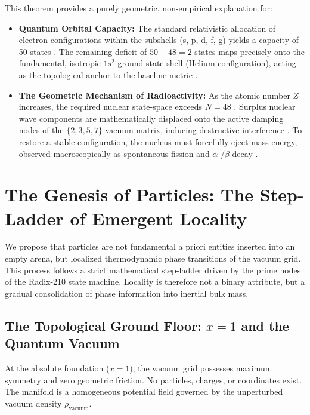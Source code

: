 \documentclass[twocolumn]{aa}
\begin{document}
This theorem provides a purely geometric, non-empirical explanation for:
\begin{itemize}
    \item \textbf{Quantum Orbital Capacity:} The standard relativistic allocation of electron configurations within the subshells (s, p, d, f, g) yields a capacity of 50 states \cite{riemann1857}. The remaining deficit of $50 - 48 = 2$ states maps precisely onto the fundamental, isotropic $1s^2$ ground-state shell (Helium configuration), acting as the topological anchor to the baseline metric \cite{riemann1857}.
    \item \textbf{The Geometric Mechanism of Radioactivity:} As the atomic number $Z$ increases, the required nuclear state-space exceeds $N = 48$ \cite{riemann1857}. Surplus nuclear wave components are mathematically displaced onto the active damping nodes of the $\{2, 3, 5, 7\}$ vacuum matrix, inducing destructive interference \cite{riemann1857}. To restore a stable configuration, the nucleus must forcefully eject mass-energy, observed macroscopically as spontaneous fission and $\alpha$-/$\beta$-decay \cite{woosley1993}.
\end{itemize}

\section{The Genesis of Particles: The Step-Ladder of Emergent Locality}
\label{sec:genesis_particles}

We propose that particles are not fundamental a priori entities inserted into an empty arena, but localized thermodynamic phase transitions of the vacuum grid. This process follows a strict mathematical step-ladder driven by the prime nodes of the Radix-210 state machine. Locality is therefore not a binary attribute, but a gradual consolidation of phase information into inertial bulk mass.

\subsection{The Topological Ground Floor: $x=1$ and the Quantum Vacuum}
At the absolute foundation ($x=1$), the vacuum grid possesses maximum symmetry and zero geometric friction. No particles, charges, or coordinates exist. The manifold is a homogeneous potential field governed by the unperturbed vacuum density $\rho_{\text{vacuum}}$.
\end{document}
